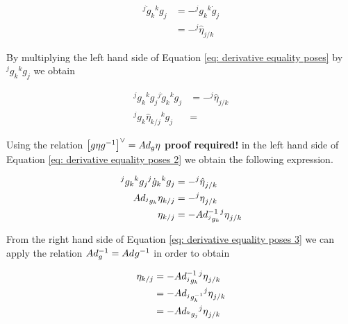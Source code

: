 \documentclass[12pt,a4paper]{book}
\begin{document}
\begin{equation}\label{eq: derivative equality poses}
\begin{aligned}
	{^j\dot{g}_k}{^kg_j} 	&= - {^jg_k}{^k\dot{g}_j} \\
							&= - {^j} \hat{\eta}_{j/k}
\end{aligned}
\end{equation}


By multiplying the left hand side of Equation \eqref{eq: derivative equality poses} by ${^jg_k}{^kg_j}$ we obtain


\begin{equation}\label{eq: derivative equality poses 2}
\begin{aligned}
	{^jg_k}{^kg_j}{^j\dot{g}_k}{^kg_j} 	&= - {^j} \hat{\eta}_{j/k}\\
	{^jg_k} \hat{\eta}_{k/j}{^kg_j}		&= 
\end{aligned}
\end{equation}

Using the relation $\left[ g\eta g ^{-1} \right]^\vee = Ad_g \eta $ \color{red}\textbf{proof required!}\color{black} in the left hand side of Equation \eqref{eq: derivative equality poses 2} we obtain the following expression.

\begin{equation}\label{eq: derivative equality poses 3}
\begin{aligned}
	{^jg_k}{^kg_j}{^j\dot{g}_k}{^kg_j} 	&= - {^j \hat{\eta}}_{j/k}\\
	Ad_{^jg_k} \eta_{k/j}					&= - {^j {\eta}}_{j/k} \\
	\eta_{k/j} &= - Ad_{^jg_k} ^{-1} {^j {\eta}}_{j/k}
\end{aligned}
\end{equation}

From the right hand side of Equation \eqref{eq: derivative equality poses 3} we can apply the relation $Ad_g ^{-1} = Ad_{} g^{-1}$ in order to obtain

\begin{equation}\label{eq: derivative equality poses 4}
\begin{aligned}
	\eta_{k/j} 	&= - Ad_{^jg_k} ^{-1} {^j {\eta}}_{j/k} \\
				&= - Ad_{^jg_k^{-1}}  {^j {\eta}}_{j/k} \\
				&= - Ad_{^kg_j}  {^j {\eta}}_{j/k} \\
\end{aligned}
\end{equation}
\end{document}
